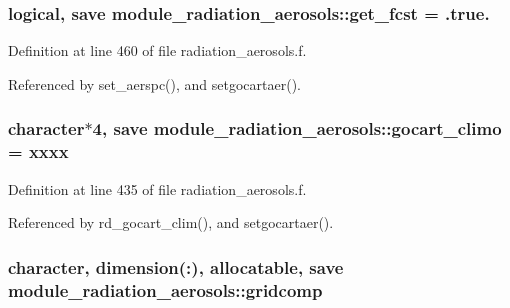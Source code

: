 \subsubsection[{\texorpdfstring{get\+\_\+fcst}{get_fcst}}]{\setlength{\rightskip}{0pt plus 5cm}logical, save module\+\_\+radiation\+\_\+aerosols\+::get\+\_\+fcst = .true.\hspace{0.3cm}{\ttfamily [private]}}\hypertarget{group__module__radiation__aerosols_ga36f851e49de5e1f7da38da5fa6ea445c}{}\label{group__module__radiation__aerosols_ga36f851e49de5e1f7da38da5fa6ea445c}


Definition at line 460 of file radiation\+\_\+aerosols.\+f.



Referenced by set\+\_\+aerspc(), and setgocartaer().

\subsubsection[{\texorpdfstring{gocart\+\_\+climo}{gocart_climo}}]{\setlength{\rightskip}{0pt plus 5cm}character$\ast$4, save module\+\_\+radiation\+\_\+aerosols\+::gocart\+\_\+climo = \textquotesingle{}xxxx\textquotesingle{}\hspace{0.3cm}{\ttfamily [private]}}\hypertarget{group__module__radiation__aerosols_gab8118108e60a4795a8caa5af71232399}{}\label{group__module__radiation__aerosols_gab8118108e60a4795a8caa5af71232399}


Definition at line 435 of file radiation\+\_\+aerosols.\+f.



Referenced by rd\+\_\+gocart\+\_\+clim(), and setgocartaer().

\subsubsection[{\texorpdfstring{gridcomp}{gridcomp}}]{\setlength{\rightskip}{0pt plus 5cm}character, dimension(\+:), allocatable, save module\+\_\+radiation\+\_\+aerosols\+::gridcomp\hspace{0.3cm}{\ttfamily [private]}}\hypertarget{group__module__radiation__aerosols_ga48c2c6c9c509f5c37fea5d788040ad7a}{}\label{group__module__radiation__aerosols_ga48c2c6c9c509f5c37fea5d788040ad7a}


